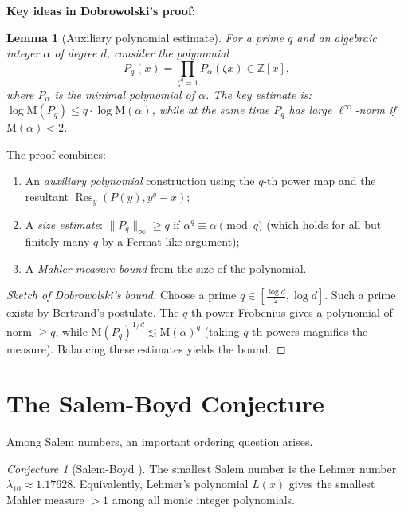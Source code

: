 \documentclass[12pt,a4paper]{amsart}
\newtheorem{lemma}[theorem]{Lemma}
\theoremstyle{definition}
\theoremstyle{remark}
\newtheorem{conjecture}[theorem]{Conjecture}
\newcommand{\Z}{\mathbb{Z}}
\newcommand{\M}{\mathrm{M}}
\DeclareMathOperator{\Res}{Res}
\begin{document}
\textbf{Key ideas in Dobrowolski's proof:}

\begin{lemma}[Auxiliary polynomial estimate]
  For a prime $q$ and an algebraic integer $\alpha$ of degree $d$, consider the
  polynomial
  \[
    P_q(x) = \prod_{\zeta^q = 1} P_\alpha(\zeta x) \in \Z[x],
  \]
  where $P_\alpha$ is the minimal polynomial of $\alpha$. The key estimate is:
  $\log \M(P_q) \leq q \cdot \log \M(\alpha)$,
  while at the same time $P_q$ has large $\ell^\infty$-norm if $\M(\alpha) < 2$.
\end{lemma}

The proof combines:
\begin{enumerate}[label=(\roman*)]
  \item An \emph{auxiliary polynomial} construction using the $q$-th power map and
    the resultant $\Res_y(P(y), y^q - x)$;
  \item A \emph{size estimate}: $\| P_q \|_\infty \geq q$ if $\alpha^q \equiv \alpha \pmod{q}$
    (which holds for all but finitely many $q$ by a Fermat-like argument);
  \item A \emph{Mahler measure bound} from the size of the polynomial.
\end{enumerate}

\begin{proof}[Sketch of Dobrowolski's bound]
  Choose a prime $q \in [\frac{\log d}{2}, \log d]$. Such a prime exists by
  Bertrand's postulate. The $q$-th power Frobenius gives a polynomial of norm $\geq q$,
  while $\M(P_q)^{1/d} \lesssim \M(\alpha)^q$ (taking $q$-th powers magnifies the measure).
  Balancing these estimates yields the bound.
\end{proof}

\section{The Salem-Boyd Conjecture}\label{sec:salem_boyd}

Among Salem numbers, an important ordering question arises.

\begin{conjecture}[Salem-Boyd \cite{Boyd1977}]\label{conj:salemboyd}
  The smallest Salem number is the Lehmer number $\lambda_{10} \approx 1.17628$.
  Equivalently, Lehmer's polynomial $L(x)$ gives the smallest Mahler measure $> 1$ among
  all monic integer polynomials.
\end{conjecture}
\end{document}
